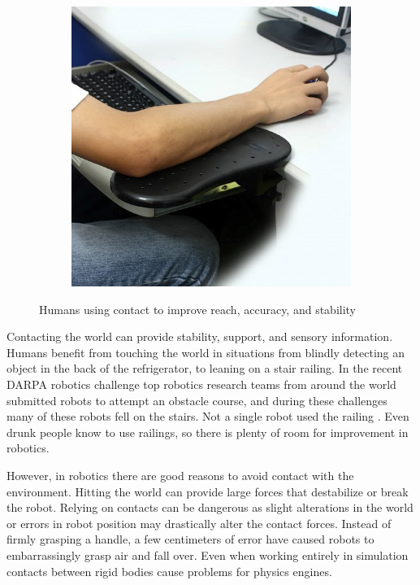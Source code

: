 \documentclass[../thesis.tex]{subfiles}
\begin{document}
\begin{figure}
\begin{subfigure}[b]{0.3\linewidth}
    \includegraphics[width=\linewidth]{./Introduction/mouse.jpg}    
  \end{subfigure}
  \label{fig:HumanContact}
  \caption{Humans using contact to improve reach, accuracy, and stability}    
\end{figure}



Contacting the world can provide stability, support, and sensory information.
Humans benefit from touching the world in situations from blindly detecting an object in the back of the refrigerator, to leaning on a stair railing. 
In the recent DARPA robotics challenge top robotics research teams from around the world submitted robots to attempt an obstacle course, and during these challenges many of these robots fell on the stairs. 
Not a single robot used the railing \cite{Atkeson2015}.
Even drunk people know to use railings, so there is plenty of room for improvement in robotics.

However, in robotics there are good reasons to avoid contact with the environment.
Hitting the world can provide large forces that destabilize or break the robot.
Relying on contacts can be dangerous as slight alterations in the world or errors in robot position may drastically alter the contact forces.
Instead of firmly grasping a handle, a few centimeters of error have caused robots to embarrassingly grasp air and fall over.
Even when working entirely in simulation contacts between rigid bodies cause problems for physics engines.
\end{document}
